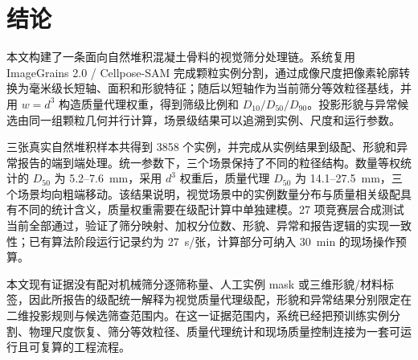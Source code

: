\clearpage
\section{结论}
\label{sec:r-conclusion-final}

本文构建了一条面向自然堆积混凝土骨料的视觉筛分处理链。系统复用 ImageGrains 2.0 / Cellpose-SAM 完成颗粒实例分割，通过成像尺度把像素轮廓转换为毫米级长短轴、面积和形貌特征；随后以短轴作为当前筛分等效粒径基线，并用 $w=d^3$ 构造质量代理权重，得到筛级比例和 $D_{10}/D_{50}/D_{90}$。投影形貌与异常候选由同一组颗粒几何并行计算，场景级结果可以追溯到实例、尺度和运行参数。

三张真实自然堆积样本共得到 3858 个实例，并完成从实例结果到级配、形貌和异常报告的端到端处理。统一参数下，三个场景保持了不同的粒径结构。数量等权统计的 $D_{50}$ 为 5.2--7.6~mm，采用 $d^3$ 权重后，质量代理 $D_{50}$ 为 14.1--27.5~mm，三个场景均向粗端移动。该结果说明，视觉场景中的实例数量分布与质量相关级配具有不同的统计含义，质量权重需要在级配计算中单独建模。27 项竞赛层合成测试当前全部通过，验证了筛分映射、加权分位数、形貌、异常和报告逻辑的实现一致性；已有算法阶段运行记录约为 27~s/张，计算部分可纳入 30~min 的现场操作预算。

本文现有证据没有配对机械筛分逐筛称量、人工实例 mask 或三维形貌/材料标签，因此所报告的级配统一解释为视觉质量代理级配，形貌和异常结果分别限定在二维投影规则与候选筛查范围内。在这一证据范围内，系统已经把预训练实例分割、物理尺度恢复、筛分等效粒径、质量代理统计和现场质量控制连接为一套可运行且可复算的工程流程。